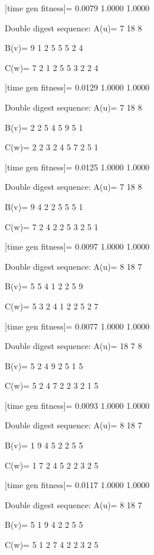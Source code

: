 [time gen fitness]=
    0.0079    1.0000    1.0000

Double digest sequence:
A(u)=
     7    18     8

B(v)=
     9     1     2     5     5     5     2     4

C(w)=
     7     2     1     2     5     5     3     2     2     4

[time gen fitness]=
    0.0129    1.0000    1.0000

Double digest sequence:
A(u)=
     7    18     8

B(v)=
     2     2     5     4     5     9     5     1

C(w)=
     2     2     3     2     4     5     7     2     5     1

[time gen fitness]=
    0.0125    1.0000    1.0000

Double digest sequence:
A(u)=
     7    18     8

B(v)=
     9     4     2     2     5     5     5     1

C(w)=
     7     2     4     2     2     5     3     2     5     1

[time gen fitness]=
    0.0097    1.0000    1.0000

Double digest sequence:
A(u)=
     8    18     7

B(v)=
     5     5     4     1     2     2     5     9

C(w)=
     5     3     2     4     1     2     2     5     2     7

[time gen fitness]=
    0.0077    1.0000    1.0000

Double digest sequence:
A(u)=
    18     7     8

B(v)=
     5     2     4     9     2     5     1     5

C(w)=
     5     2     4     7     2     2     3     2     1     5

[time gen fitness]=
    0.0093    1.0000    1.0000

Double digest sequence:
A(u)=
     8    18     7

B(v)=
     1     9     4     5     2     2     5     5

C(w)=
     1     7     2     4     5     2     2     3     2     5

[time gen fitness]=
    0.0117    1.0000    1.0000

Double digest sequence:
A(u)=
     8    18     7

B(v)=
     5     1     9     4     2     2     5     5

C(w)=
     5     1     2     7     4     2     2     3     2     5

